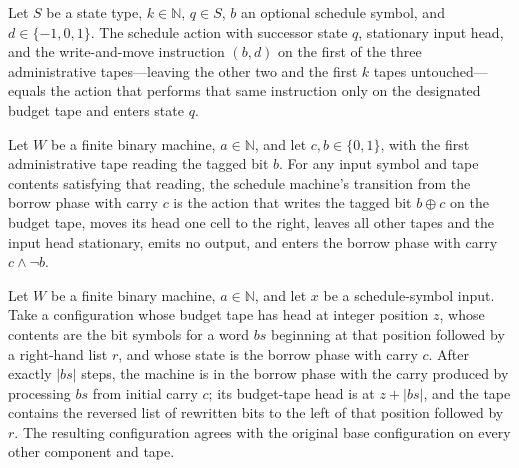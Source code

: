 \begin{lemma}
\label{Complexity.oblAction_budget}
\leanok
{}
Let $S$ be a state type, $k \in \mathbb{N}$, $q \in S$, $b$ an optional schedule symbol,
and $d \in \{-1,0,1\}$. The schedule action with successor state $q$, stationary input
head, and the write-and-move instruction $(b,d)$ on the first of the three
administrative tapes—leaving the other two and the first $k$ tapes untouched—equals the
action that performs that same instruction only on the designated budget tape and enters
state $q$.
\end{lemma}

\begin{lemma}
\label{Complexity.obliviousSchedule_borrow}
\leanok
{}
Let $W$ be a finite binary machine, $a\in\mathbb{N}$, and let $c,b\in\{0,1\}$, with the
first administrative tape reading the tagged bit $b$. For any input symbol and tape
contents satisfying that reading, the schedule machine's transition from the borrow
phase with carry $c$ is the action that writes the tagged bit $b\oplus c$ on the budget
tape, moves its head one cell to the right, leaves all other tapes and the input head
stationary, emits no output, and enters the borrow phase with carry $c\wedge\lnot b$.
\end{lemma}

\begin{lemma}
\label{Complexity.obliviousSchedule_borrow_run}
\leanok
{}
Let $W$ be a finite binary machine, $a\in\mathbb{N}$, and let $x$ be a schedule-symbol
input. Take a configuration whose budget tape has head at integer position $z$, whose
contents are the bit symbols for a word $bs$ beginning at that position followed by a
right-hand list $r$, and whose state is the borrow phase with carry $c$. After exactly
$|bs|$ steps, the machine is in the borrow phase with the carry produced by processing
$bs$ from initial carry $c$; its budget-tape head is at $z+|bs|$, and the tape contains
the reversed list of rewritten bits to the left of that position followed by $r$. The
resulting configuration agrees with the original base configuration on every other
component and tape.
\end{lemma}


